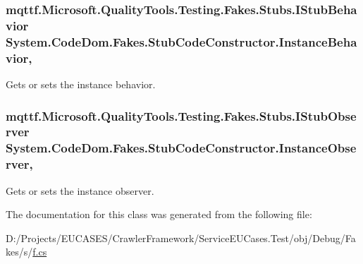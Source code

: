 \hypertarget{class_system_1_1_code_dom_1_1_fakes_1_1_stub_code_constructor_a7d99ce88089b33068acb5d617529a2e3}{
\subsubsection[{Instance\-Behavior}]{\setlength{\rightskip}{0pt plus 5cm}mqttf.\-Microsoft.\-Quality\-Tools.\-Testing.\-Fakes.\-Stubs.\-I\-Stub\-Behavior System.\-Code\-Dom.\-Fakes.\-Stub\-Code\-Constructor.\-Instance\-Behavior\hspace{0.3cm}{\ttfamily [get]}, {\ttfamily [set]}}}\label{class_system_1_1_code_dom_1_1_fakes_1_1_stub_code_constructor_a7d99ce88089b33068acb5d617529a2e3}


Gets or sets the instance behavior.

\hypertarget{class_system_1_1_code_dom_1_1_fakes_1_1_stub_code_constructor_ac7e9e99433f6c8290c637a3338803e23}{
\subsubsection[{Instance\-Observer}]{\setlength{\rightskip}{0pt plus 5cm}mqttf.\-Microsoft.\-Quality\-Tools.\-Testing.\-Fakes.\-Stubs.\-I\-Stub\-Observer System.\-Code\-Dom.\-Fakes.\-Stub\-Code\-Constructor.\-Instance\-Observer\hspace{0.3cm}{\ttfamily [get]}, {\ttfamily [set]}}}\label{class_system_1_1_code_dom_1_1_fakes_1_1_stub_code_constructor_ac7e9e99433f6c8290c637a3338803e23}


Gets or sets the instance observer.



The documentation for this class was generated from the following file\-:\begin{DoxyCompactItemize}
\item 
D\-:/\-Projects/\-E\-U\-C\-A\-S\-E\-S/\-Crawler\-Framework/\-Service\-E\-U\-Cases.\-Test/obj/\-Debug/\-Fakes/s/\hyperlink{s_2f_8cs}{f.\-cs}\end{DoxyCompactItemize}
